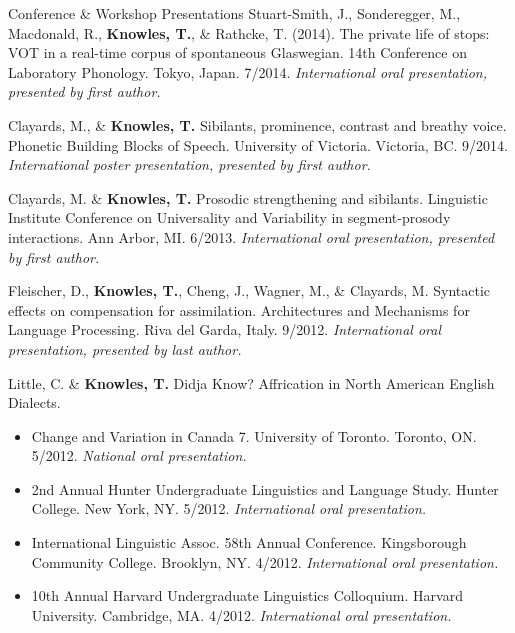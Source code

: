 \documentclass{resume} %
\begin{document}
\begin{rSection}{Conference \& Workshop Presentations}
	Stuart-Smith, J., Sonderegger, M., Macdonald, R., {\bf Knowles, T.}, \& Rathcke, T. (2014). The private life of stops: VOT in a real-time corpus of spontaneous Glaswegian. 14th Conference on Laboratory Phonology. Tokyo, Japan. 7/2014. \emph{International oral presentation, presented by first author.}
	
	Clayards, M., \& {\bf Knowles, T.} Sibilants, prominence, contrast and breathy voice. Phonetic Building Blocks of Speech. University of Victoria. Victoria, BC. 9/2014. \emph{International poster presentation, presented by first author.}
	
	
	Clayards, M. \& {\bf Knowles, T.} Prosodic strengthening and sibilants. Linguistic Institute Conference on Universality and Variability in segment-prosody interactions. Ann Arbor, MI. 6/2013. \emph{International oral presentation, presented by first author.}
	
	Fleischer, D., {\bf Knowles, T.}, Cheng, J., Wagner, M., \& Clayards, M. Syntactic effects on compensation for assimilation. Architectures and Mechanisms for Language Processing. Riva del Garda, Italy. 9/2012. \emph{International oral presentation, presented by last author.}
	
	Little, C. \& {\bf Knowles, T.} Didja Know? Affrication in North American English Dialects.
	\begin{itemize}
				\renewcommand\labelitemi{$\cdot$}
		\item Change and Variation in Canada 7. University of Toronto. Toronto, ON. 5/2012. \emph{National oral presentation.}
		\item 2nd Annual Hunter Undergraduate Linguistics and Language Study. Hunter College. New York, NY. 5/2012. \emph{International oral presentation.}
		\item International Linguistic Assoc. 58th Annual Conference. Kingsborough Community College. Brooklyn, NY. 4/2012. \emph{International oral presentation.}
		\item 10th Annual Harvard Undergraduate Linguistics Colloquium. Harvard University. Cambridge, MA. 4/2012. \emph{International oral presentation.}
	\end{itemize}
	

\end{rSection}
\end{document}
